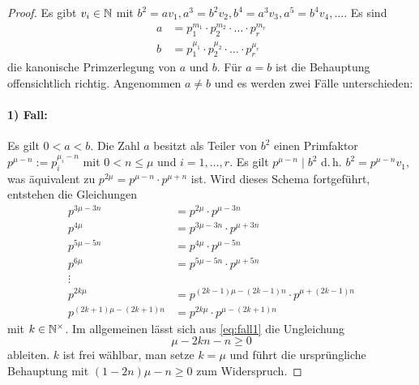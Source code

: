 \begin{proof}
Es gibt $v_i \in \mathbb{N}{}$ mit
$b^2 = av_1, a^3 = b^2v_2, b^4 = a^3v_3, a^5 = b^4v_4, \dotsc$.
Es sind
\begin{align*}
  a & = p_1^{m_1} \cdot p_2^{m_2} \cdot \ldots \cdot p_r^{m_r} \\
  b & = p_1^{\mu_1} \cdot p_2^{\mu_2} \cdot \ldots \cdot p_r^{\mu_r}
\end{align*}
die kanonische Primzerlegung von $a$ und $b$.
Für $a = b$ ist die Behauptung offensichtlich richtig.
Angenommen $a \neq b$ und es werden zwei Fälle unterschieden:
\paragraph{1) Fall:}
Es gilt $0 < a < b$. Die Zahl $a$ besitzt als Teiler von $b^2$ einen Primfaktor
$p^{\mu - n} := p_i^{\mu_i - n}$ mit $0 < n \leq \mu$ und $i = 1,\dotsc,r$.
Es gilt $p^{\mu - n} \mid b^2$
d.\,h. $b^2 = p^{\mu - n}v_1$, was äquivalent zu
$p^{2\mu} = p^{\mu - n} \cdot p^{\mu + n}$ ist.
Wird dieses Schema fortgeführt, entstehen die Gleichungen
\begin{align*}
p^{3\mu - 3n} & = p^{2\mu}      \cdot p^{\mu - 3n} \\
p^{4\mu}      & = p^{3\mu - 3n} \cdot p^{\mu + 3n} \\
p^{5\mu - 5n} & = p^{4\mu}      \cdot p^{\mu - 5n} \\
p^{6\mu}      & = p^{5\mu - 5n} \cdot p^{\mu + 5n} \\
\vdots \\
p^{2k\mu} & = p^{(2k - 1)\mu - (2k - 1)n} \cdot p^{\mu + (2k - 1)n}  \\
\label{eq:fall1} \tag{$*$}
p^{(2k + 1)\mu - (2k + 1)n} & = p^{2k\mu} \cdot p^{\mu - (2k + 1)n}
\end{align*}
mit $k \in \mathbb{N}^\times{}$. Im allgemeinen lässt sich aus \eqref{eq:fall1}
die Ungleichung
\begin{equation*}
\mu - 2kn - n \geq 0
\end{equation*}
ableiten. $k$ ist frei wählbar, man setze $k = \mu$ und führt
die ursprüngliche Behauptung mit $(1 - 2n)\mu - n \geq 0$ zum Widerspruch.

\end{proof}
